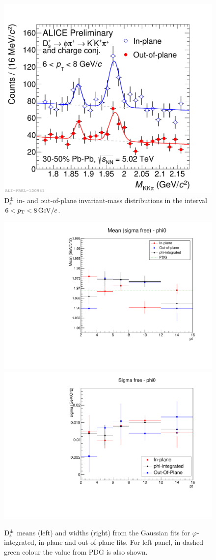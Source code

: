 \begin{figure}
\centering
 \includegraphics[width=.7\textwidth]{FigCap5/MassDsInOutOfPlane_PbPb3050_5TeV_pt6-8.pdf}
\caption{${\rm D_s^{\pm}}$ in- and out-of-plane invariant-mass distributions in the interval $6 < p_{\rm T} <8 \, \mathrm{GeV}/c$.}
\label{fig:deltaphibinsds}
\end{figure}
\begin{figure}
\centering
 \includegraphics[width=.43\textwidth]{FigCap5/MeanDsInOutFull.pdf}
 \includegraphics[width=.43\textwidth]{FigCap5/SigmaDsInOutFull.pdf}
\caption{${\rm D_s^{\pm}}$ means (left) and widths (right) from the Gaussian fits for $\varphi$-integrated, in-plane and out-of-plane fits. For left panel, in dashed green colour the value from PDG is also shown.}
\label{fig:deltaphibinsds}
\end{figure}

